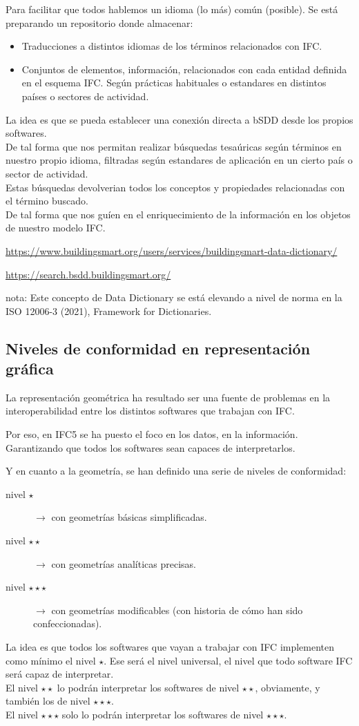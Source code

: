 \documentclass[spanish,10pt,a4paper,final,oneside]{article}
\begin{document}
Para facilitar que todos hablemos un idioma (lo más) común (posible). Se está preparando un repositorio donde almacenar:
\begin{itemize}
\item Traducciones a distintos idiomas de los términos relacionados con IFC.
\item Conjuntos de elementos, información, relacionados con cada entidad definida en el esquema IFC. Según prácticas habituales o estandares en distintos países o sectores de actividad.
\end{itemize}

La idea es que se pueda establecer una conexión directa a bSDD desde los propios softwares.
\\De tal forma que nos permitan realizar búsquedas tesaúricas según términos en nuestro propio idioma, filtradas según estandares de aplicación en un cierto país o sector de actividad.
\\Estas búsquedas devolverian todos los conceptos y propiedades relacionadas con el término buscado.
\\De tal forma que nos guíen en el enriquecimiento de la información en los objetos de nuestro modelo IFC.

\url{https://www.buildingsmart.org/users/services/buildingsmart-data-dictionary/}

\url{https://search.bsdd.buildingsmart.org/}

nota: Este concepto de Data Dictionary se está elevando a nivel de norma en la ISO 12006-3 (2021), Framework for Dictionaries.

\subsection{Niveles de conformidad en representación gráfica}
La representación geométrica ha resultado ser una fuente de problemas en la interoperabilidad entre los distintos softwares que trabajan con IFC.

Por eso, en IFC5 se ha puesto el foco en los datos, en la información. Garantizando que todos los softwares sean capaces de interpretarlos.

\vspace{0.3cm}
Y en cuanto a la geometría, se han definido una serie de niveles de conformidad:
\begin{description}
\item[nivel $\star$] $\rightarrow$ con geometrías básicas simplificadas.
\item[nivel $\star\star$] $\rightarrow$ con geometrías analíticas precisas.
\item[nivel $\star\star\star$] $\rightarrow$ con geometrías modificables (con historia de cómo han sido confeccionadas).
\end{description}
La idea es que todos los softwares que vayan a trabajar con IFC implementen como mínimo el nivel $\star$. Ese será el nivel universal, el nivel que todo software IFC será capaz de interpretar.
\\El nivel $\star\star$ lo podrán interpretar los softwares de nivel $\star\star$, obviamente, y también los de nivel $\star\star\star$.
\\El nivel $\star\star\star$ solo lo podrán interpretar los softwares de nivel $\star\star\star$.
\end{document}
